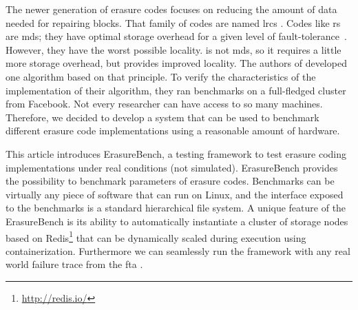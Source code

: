 The newer generation of erasure codes focuses on reducing the amount of data needed for repairing blocks.
That family of codes are named \acp{lrc} \autocite{lrc}.
Codes like \ac{rs} are \ac{mds}; they have optimal storage overhead for a given level of fault-tolerance~\autocite{XorbasVLDB}.
However, they have the worst possible locality.
 is not \ac{mds}, so it requires a little more storage overhead, but provides improved locality.
The authors of \autocite{XorbasVLDB} developed one algorithm based on that principle.
To verify the characteristics of the implementation of their algorithm, they ran benchmarks on a full-fledged cluster from Facebook.
Not every researcher can have access to so many machines. 
Therefore, we decided to develop a system that can be used to benchmark different erasure code implementations using a reasonable amount of hardware.

This article introduces ErasureBench, a testing framework to test erasure coding implementations under real conditions (not simulated). ErasureBench provides the possibility to benchmark parameters of erasure codes.
Benchmarks can be virtually any piece of software that can run on Linux, and the interface exposed to the benchmarks is a standard hierarchical file system.
A unique feature of the ErasureBench is its ability to automatically instantiate a cluster of storage nodes based on Redis\footnote{\url{http://redis.io/}} that can be dynamically scaled during execution using containerization.
Furthermore we can seamlessly run the framework with any real world failure trace from the \ac{fta} \autocite{fta-journal,fta-paper}.
